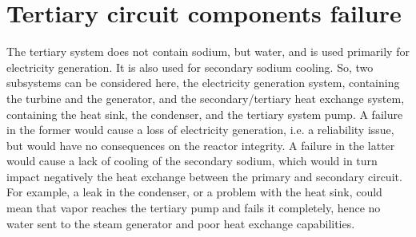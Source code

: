


\section{Tertiary circuit components failure}
\label{sec3:tertiary_failures}

The tertiary system does not contain sodium, but water, and is used primarily for electricity generation. It is also used for secondary sodium cooling. So, two subsystems can be considered here, the electricity generation system, containing the turbine and the generator, and the secondary/tertiary heat exchange system, containing the heat sink, the condenser, and the tertiary system pump. A failure in the former would cause a loss of electricity generation, i.e. a reliability issue, but would have no consequences on the reactor integrity. A failure in the latter would cause a lack of cooling of the secondary sodium, which would in turn impact negatively the heat exchange between the primary and secondary circuit. For example, a leak in the condenser, or a problem with the heat sink, could mean that vapor reaches the tertiary pump and fails it completely, hence no water sent to the steam generator and poor heat exchange capabilities.

